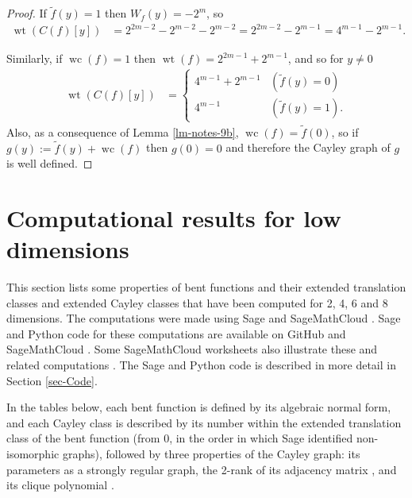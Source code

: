 \documentclass[12pt,a4paper]{article}
\newcommand{\dual}[1]{\widetilde{#1}}
\newcommand{\weight}[1]{\operatorname{wt}\left(#1\right)}
\newcommand{\weightclass}[1]{\operatorname{wc}\left(#1\right)}
\begin{document}
\begin{proof}
If $\dual{f}(y) = 1$ then $W_f(y) = -2^m$, so
\begin{align*}
\weight{C(f)[y]}
&=
2^{2m-2}-2^{m-2} - 2^{m-2}
=
2^{2m-2} - 2^{m-1}
=
4^{m-1} - 2^{m-1}.
\end{align*}

Similarly, if $\weightclass{f} = 1$ then $\weight{f} = 2^{2m-1}+2^{m-1}$,
and so for $y \neq 0$
\begin{align*}
\weight{C(f)[y]}
&=
\begin{cases}
4^{m-1} + 2^{m-1} & (\dual{f}(y)=0)
\\
4^{m-1}           & (\dual{f}(y)=1).
\end{cases}
\end{align*}
Also, as a consequence of Lemma \ref{lm-notes-9b}, $\weightclass{f} = \dual{f}(0)$,
so if $g(y) := \dual{f}(y) + \weightclass{f}$ then $g(0)=0$ and therefore the Cayley graph of $g$
is well defined.
\end{proof}


\section{Computational results for low dimensions}
\label{sec-Empirical}
This section lists some properties of bent functions and their extended translation classes and extended Cayley classes
that have been computed for 2, 4, 6 and 8 dimensions.
The computations were made using Sage \cite{SageMath7517} and Sage\-Math\-Cloud \cite{SageMathCloud}.
Sage and Python code for these computations are available on GitHub \cite{Leo16GitHub} and Sage\-Math\-Cloud \cite{Leo16SMC}.
Some Sage\-Math\-Cloud worksheets also illustrate these and related computations \cite{Leo16SMC}.
The Sage and Python code is described in more detail in Section \ref{sec-Code}.

In the tables below, each bent function is defined by its algebraic normal form, and each Cayley class is described by
its number within the extended translation class of the bent function (from 0, in the order in which Sage identified non-isomorphic graphs),
followed by three properties of the Cayley graph: its parameters as a strongly regular graph, the 2-rank of its adjacency matrix \cite{Brov92},
and its clique polynomial \cite{HoeL94}.

\end{document}
